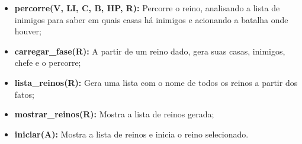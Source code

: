 \begin{itemize}
		\item \textbf{percorre(V, LI, C, B, HP, R):} Percorre o reino, analisando a lista de inimigos para saber em quais casas há inimigos e acionando a batalha onde houver;
		\item \textbf{carregar\_fase(R):} A partir de um reino dado, gera suas casas, inimigos, chefe e o percorre;
		\item \textbf{lista\_reinos(R):} Gera uma lista com o nome de todos os reinos a partir dos fatos;
		\item \textbf{mostrar\_reinos(R):} Mostra a lista de reinos gerada;
		\item \textbf{iniciar(A):} Mostra a lista de reinos e inicia o reino selecionado.
	\end{itemize}



	
	